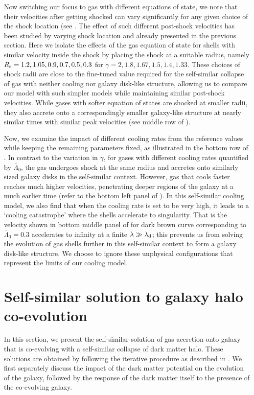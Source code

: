 Now switching our focus to gas with different equations of state, we note that their velocities after getting shocked can vary significantly for any given choice of the shock location (see . The effect of such different post-shock velocities has been studied by varying shock location and already presented in the previous section. Here we isolate the effects of the gas equation of state for shells with similar velocity inside the shock by placing the shock at a suitable radius, namely $R_{\rm s}=1.2,1.05,0.9,0.7,0.5, 0.3$ for $\gamma=2,1.8,1.67,1.5,1.4, 1.33$. These choices of shock radii are close to the fine-tuned value required for the self-similar collapse of gas with neither cooling nor galaxy disk-like structure, allowing us to compare our model with such simpler models while maintaining similar post-shock velocities.
While gases with softer equation of states are shocked at smaller radii, they also accrete onto a correspondingly smaller galaxy-like structure at nearly similar times with similar peak velocities (see middle row of ). %

Now, we examine the impact of different cooling rates from the reference values while keeping the remaining parameters fixed, as illustrated in the bottom row of . In contrast to the variation in $\gamma$, for gases with different cooling rates quantified by $\bar{\Lambda}_0$, the gas undergoes shock at the same radius and accretes onto similarly sized galaxy disks in the self-similar context. However, gas that cools faster reaches much higher velocities, penetrating deeper regions of the galaxy at a much earlier time (refer to the bottom left panel of ).
In this self-similar cooling model, we also find that when the cooling rate is set to be very high, it leads to a `cooling catastrophe' where the shells accelerate to singularity. That is the velocity shown in bottom middle panel of  for dark brown curve corresponding to $\bar{\Lambda}_0=0.3$ accelerates to infinity at a finite $\lambda \gg \lambda_{\rm d}$; %
this prevents us from solving the evolution of gas shells further in this self-similar context to form a galaxy disk-like structure. We choose to ignore these unphysical configurations that represent the limits of our cooling model. 








\section{Self-similar solution to galaxy halo co-evolution}
\label{sec:results-gas-dm-coevolve-ch:ssr}
In this section, we 
present the self-similar solution of gas accretion onto galaxy that is co-evolving with a self-similar collapse of dark matter halo. These solutions are obtained by following the iterative procedure as described in . We first separately discuss the impact of the dark matter potential on the evolution of the galaxy, followed by the response of the dark matter itself to the presence of the co-evolving galaxy.



